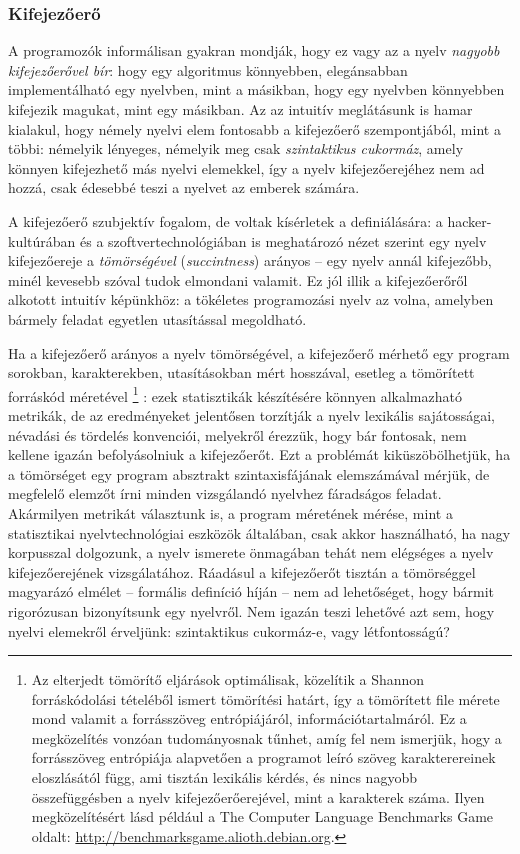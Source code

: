 \subsubsection{Kifejezőerő}
A programozók informálisan gyakran mondják, hogy ez vagy az a nyelv \textit{nagyobb kifejezőerővel bír}: hogy egy algoritmus könnyebben, elegánsabban implementálható egy nyelvben, mint a másikban, hogy egy nyelvben könnyebben kifejezik magukat, mint egy másikban.
Az az intuitív meglátásunk is hamar kialakul, hogy némely nyelvi elem fontosabb a kifejezőerő szempontjából, mint a többi: némelyik lényeges, némelyik meg csak \textit{szintaktikus cukormáz}, amely könnyen kifejezhető más nyelvi elemekkel, így a nyelv kifejezőerejéhez nem ad hozzá, csak édesebbé teszi a nyelvet az emberek számára.\cite{Landin64}

A kifejezőerő szubjektív fogalom, de voltak kísérletek a definiálására: a hacker-kultúrában\cite{Graham02} és a szoftvertechnológiában\cite{MythManMonth}\cite{CodeComplete} is meghatározó nézet szerint egy nyelv kifejezőereje a \textit{tömörségével} (\textit{succintness}) arányos -- egy nyelv annál kifejezőbb, minél kevesebb szóval tudok elmondani valamit.
Ez jól illik a kifejezőerőről alkotott intuitív képünkhöz: a tökéletes programozási nyelv az volna, amelyben bármely feladat egyetlen utasítással megoldható.

Ha a kifejezőerő arányos a nyelv tömörségével, a kifejezőerő mérhető egy program sorokban, karakterekben, utasításokban mért hosszával, esetleg a tömörített forráskód méretével%
\footnote{%
Az elterjedt tömörítő eljárások optimálisak, közelítik a Shannon forráskódolási tételéből ismert tömörítési határt, így a tömörített file mérete mond valamit a forrásszöveg entrópiájáról, információtartalmáról.
Ez a megközelítés vonzóan tudományosnak tűnhet, amíg fel nem ismerjük, hogy a forrásszöveg entrópiája alapvetően a programot leíró szöveg karakterereinek eloszlásától függ, ami tisztán lexikális kérdés, és nincs nagyobb összefüggésben a nyelv kifejezőerőerejével, mint a karakterek száma.
Ilyen megközelítésért lásd például a The Computer Language Benchmarks Game oldalt: \url{http://benchmarksgame.alioth.debian.org}.
}%
: ezek statisztikák készítésére könnyen alkalmazható metrikák, de az eredményeket jelentősen torzítják a nyelv lexikális sajátosságai, névadási és tördelés konvenciói, melyekről érezzük, hogy bár fontosak, nem kellene igazán befolyásolniuk a kifejezőerőt.
Ezt a problémát kiküszöbölhetjük, ha a tömörséget egy program absztrakt szintaxisfájának elemszámával mérjük, de megfelelő elemzőt írni minden vizsgálandó nyelvhez fáradságos feladat.
Akármilyen metrikát választunk is, a program méretének mérése, mint a statisztikai nyelvtechnológiai eszközök általában, csak akkor használható, ha nagy korpusszal dolgozunk, a nyelv ismerete önmagában tehát nem elégséges a nyelv kifejezőerejének vizsgálatához.
Ráadásul a kifejezőerőt tisztán a tömörséggel magyarázó elmélet -- formális definíció híján -- nem ad lehetőséget, hogy bármit rigorózusan bizonyítsunk egy nyelvről.
Nem igazán teszi lehetővé azt sem, hogy nyelvi elemekről érveljünk: szintaktikus cukormáz-e, vagy létfontosságú?

